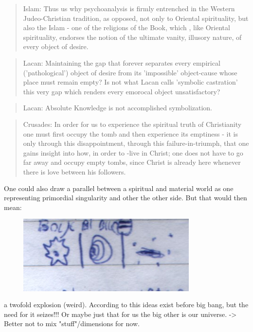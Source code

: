 \documentclass[10pt]{book}
\begin{document}
\begin{quotation}
Islam: Thus us why psychoanalysis is firmly entrenched in the Western Judeo-Christian tradition, as opposed, not only to Oriental spirituality, but also the Islam - one of the religions of the Book, which , like Oriental spirituality, endorses the notion of the ultimate vanity, illusory nature, of every object of desire.
\end{quotation}
\begin{quotation}
Lacan: Maintaining the gap that forever separates every empirical ('pathological') object of desire from its 'impossible' object-cause whose place must remain empty? Is not what Lacan calls 'symbolic castration' this very gap which renders every emorocal object unsatisfactory?
\end{quotation}
\begin{quotation}
Lacan: Absolute Knowledge is not accomplished symbolization.
\end{quotation}
\begin{quotation}
Crusades: In order for us to experience the spiritual truth of Christianity one must first occupy the tomb and then experience its emptiness - it is only through this disappointment, through this failure-in-triumph, that one gains insight into how, in order to -live in Christ; one does not have to go far away and occupy empty tombs, since Christ is already here whenever there is love between his followers.
\end{quotation}


One could also draw a parallel between a spiritual and material world as one representing primordial singularity and other the other side. But that would then mean: 
\begin{figure}[ht!]
\centering
\includegraphics[width=90mm]{scan10.jpg}
\label{overflow}
\end{figure}
a twofold explosion (weird). According to this ideas exist before big bang, but the need for it seizes!!! Or maybe just that for us the big other is our universe. -> Better not to mix "stuff"/dimensions for now.
\end{document}
